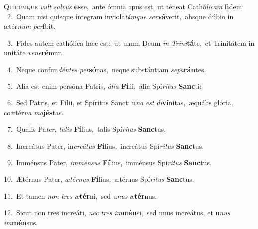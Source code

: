 \lettrine{\initial\textcolor{\initialcolor}{Q}}{uicúmque} \textit{vult} \textit{sal}\-\textit{vus} \textbf{es}\-se,~\star ante ómnia opus est, ut téneat Cathó\-\textit{li}\-\textit{cam} \textbf{fi}\-dem:\\
{\numbfont\textcolor{\numbcolor}{~2.}}~Quam nisi quisque íntegram inviola\-\textit{tám}\-\textit{que} \textit{ser}\-\textbf{vá}verit,~\star absque dúbio in ætér\textit{num} \textit{per}\-\textbf{í}bit.\par
{\numbfont\textcolor{\numbcolor}{~3.}}~Fides autem cathólica hæc est:~\dagger ut unum Deum \textit{in} \textit{Tri}\-\textit{ni}\textbf{tá}te,~\star et Trinitátem in unitáte \textit{ve}\-\textit{ne}\textbf{ré}mur.\par
{\numbfont\textcolor{\numbcolor}{~4.}}~Neque confun\-\textit{dén}\-\textit{tes} \textit{per}\-\textbf{só}nas,~\star neque substántiam \textit{se}\-\textit{pa}\textbf{rán}tes.\par
{\numbfont\textcolor{\numbcolor}{~5.}}~Alia est enim persóna Patris, \textit{á}\-\textit{li}\textit{a} \textbf{Fí}\-lii,~\star ália Spí\-\textit{ri}\-\textit{tus} \textbf{Sanc}\-ti:\par
{\numbfont\textcolor{\numbcolor}{~6.}}~Sed Patris, et Fílii, et Spíritus Sancti u\textit{na} \textit{est} \textit{di}\-\textbf{ví}nitas,~\star æquális glória, coætér\textit{na} \textit{ma}\-\textbf{jés}tas.\par
{\numbfont\textcolor{\numbcolor}{~7.}}~Qualis Pa\-\textit{ter}\-, \textit{ta}\-\textit{lis} \textbf{Fí}\-lius,~\star talis Spí\-\textit{ri}\-\textit{tus} \textbf{Sanc}\-tus.\par
{\numbfont\textcolor{\numbcolor}{~8.}}~Increátus Pater, in\-\textit{cre}\-\textit{á}\textit{tus} \textbf{Fí}\-lius,~\star increátus Spí\-\textit{ri}\-\textit{tus} \textbf{Sanc}\-tus.\par
{\numbfont\textcolor{\numbcolor}{~9.}}~Imménsus Pater, \textit{im}\-\textit{mén}\textit{sus} \textbf{Fí}\-lius,~\star imménsus Spí\-\textit{ri}\-\textit{tus} \textbf{Sanc}\-tus.\par
{\numbfont\textcolor{\numbcolor}{10.}}~Ætérnus Pater, \textit{æ}\-\textit{tér}\textit{nus} \textbf{Fí}\-lius,~\star ætérnus Spí\-\textit{ri}\-\textit{tus} \textbf{Sanc}\-tus.\par
{\numbfont\textcolor{\numbcolor}{11.}}~Et tamen \textit{non} \textit{tres} \textit{æ}\-\textbf{tér}ni,~\star sed u\textit{nus} \textit{æ}\-\textbf{tér}nus.\par
{\numbfont\textcolor{\numbcolor}{12.}}~Sicut non tres increáti, \textit{nec} \textit{tres} \textit{im}\-\textbf{mén}si,~\star sed unus increátus, et u\textit{nus} \textit{im}\-\textbf{mén}sus.\par
